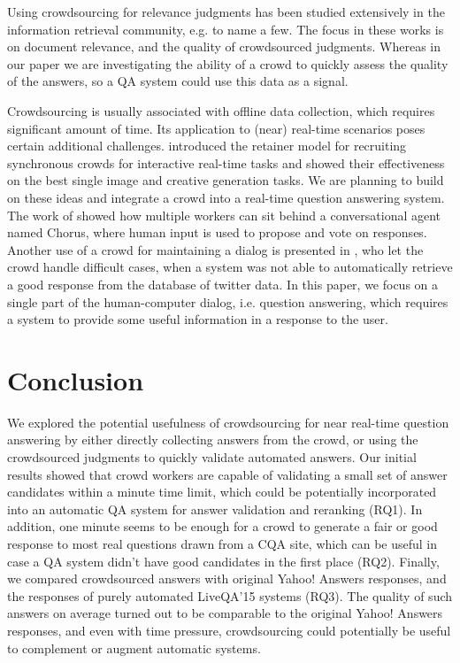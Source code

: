 \documentclass[11pt,letterpaper]{article}
\begin{document}
Using crowdsourcing for relevance judgments has been studied extensively in the information retrieval community, e.g. \cite{Alonso:2008:CRE:1480506.1480508,alonso2011design,grady2010crowdsourcing} to name a few.
The focus in these works is on document relevance, and the quality of crowdsourced judgments.
Whereas in our paper we are investigating the ability of a crowd to quickly assess the quality of the answers, so a QA system could use this data as a signal.

Crowdsourcing is usually associated with offline data collection, which requires significant amount of time.
Its application to (near) real-time scenarios poses certain additional challenges.
 introduced the retainer model for recruiting synchronous crowds for interactive real-time tasks and showed their effectiveness on the best single image and creative generation tasks.
We are planning to build on these ideas and integrate a crowd into a real-time question answering system.
The work of  showed how multiple workers can sit behind a conversational agent named Chorus, where human input is used to propose and vote on responses. 
Another use of a crowd for maintaining a dialog is presented in , who let the crowd handle difficult cases, when a system was not able to automatically retrieve a good response from the database of twitter data.
In this paper, we focus on a single part of the human-computer dialog, i.e. question answering, which requires a system to provide some useful information in a response to the user.


\section{Conclusion}
\label{sec:conclusion}

We explored the potential usefulness of crowdsourcing for near real-time question answering by either directly collecting answers from the crowd, or using the crowdsourced judgments to quickly validate automated answers.
Our initial results showed that crowd workers are capable of validating a small set of answer candidates within a minute time limit, which could be potentially incorporated into an automatic QA system for answer validation and reranking (RQ1).
In addition, one minute seems to be enough for a crowd to generate a fair or good response to most real questions drawn from a CQA site, which can be useful in case a QA system didn't have good candidates in the first place (RQ2).
Finally, we compared crowdsourced answers with original Yahoo! Answers responses, and the responses of purely automated LiveQA'15 systems (RQ3).
The quality of such answers on average turned out to be comparable to the original Yahoo! Answers responses, and even with time pressure, crowdsourcing could potentially be useful to complement or augment automatic systems.




\end{document}
